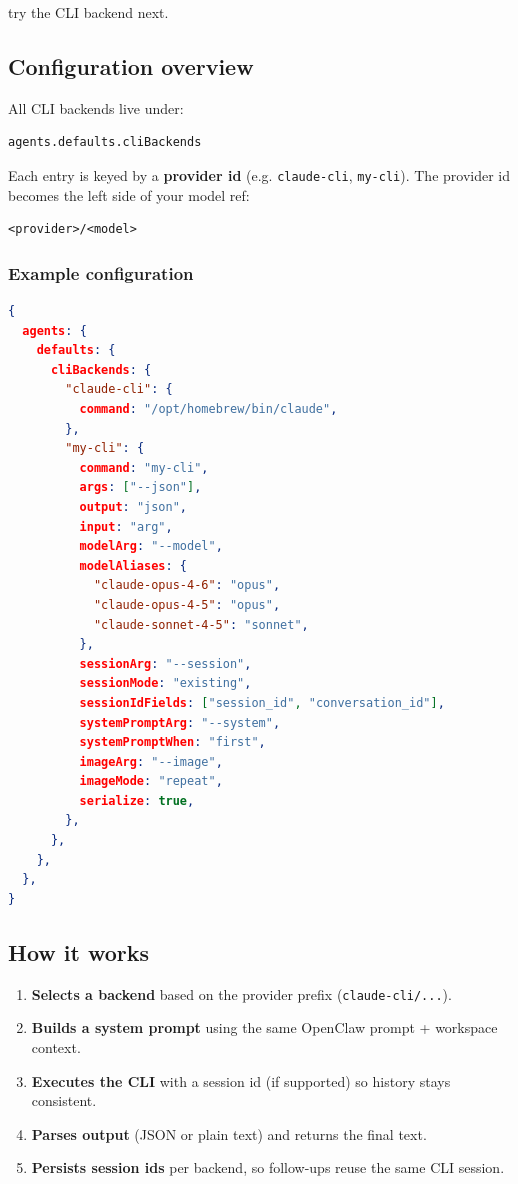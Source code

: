 try the CLI backend next.

\subsection{Configuration overview}


All CLI backends live under:

\begin{lstlisting}
agents.defaults.cliBackends
\end{lstlisting}


Each entry is keyed by a \textbf{provider id} (e.g. \texttt{claude-cli}, \texttt{my-cli}).
The provider id becomes the left side of your model ref:

\begin{lstlisting}
<provider>/<model>
\end{lstlisting}


\subsubsection{Example configuration}


\begin{lstlisting}[language=json]
{
  agents: {
    defaults: {
      cliBackends: {
        "claude-cli": {
          command: "/opt/homebrew/bin/claude",
        },
        "my-cli": {
          command: "my-cli",
          args: ["--json"],
          output: "json",
          input: "arg",
          modelArg: "--model",
          modelAliases: {
            "claude-opus-4-6": "opus",
            "claude-opus-4-5": "opus",
            "claude-sonnet-4-5": "sonnet",
          },
          sessionArg: "--session",
          sessionMode: "existing",
          sessionIdFields: ["session_id", "conversation_id"],
          systemPromptArg: "--system",
          systemPromptWhen: "first",
          imageArg: "--image",
          imageMode: "repeat",
          serialize: true,
        },
      },
    },
  },
}
\end{lstlisting}


\subsection{How it works}


\begin{enumerate}
  \item \textbf{Selects a backend} based on the provider prefix (\texttt{claude-cli/...}).
  \item \textbf{Builds a system prompt} using the same OpenClaw prompt + workspace context.
  \item \textbf{Executes the CLI} with a session id (if supported) so history stays consistent.
  \item \textbf{Parses output} (JSON or plain text) and returns the final text.
  \item \textbf{Persists session ids} per backend, so follow-ups reuse the same CLI session.
\end{enumerate}


